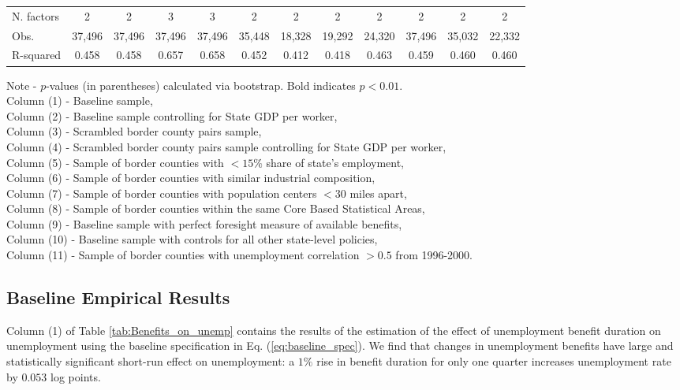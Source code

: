 \documentclass[12pt]{article}
\newcommand{\1}{\mathbf{1}}
\begin{document}
\begin{table}[t]
\begin{tabular}{lccccccccccc}
N. factors & 2 & 2 & 3 & 3 & 2 & 2 & 2 & 2 & 2 & 2 & 2\\
Obs. & 37,496 & 37,496 & 37,496 & 37,496 & 35,448 & 18,328 & 19,292 & 24,320 & 37,496 & 35,032 & 22,332\\
R-squared & 0.458 & 0.458 & 0.657 & 0.658 & 0.452 & 0.412 & 0.418 & 0.463 & 0.459 & 0.460 & 0.460\\ \hline
\end{tabular}
\parbox{16.5cm}{\noindent Note - $p$-values (in parentheses) calculated via bootstrap. Bold indicates $p<0.01$.\\
Column (1) - Baseline sample,\\
Column (2) - Baseline sample controlling for State GDP per worker,\\
Column (3) - Scrambled border county pairs sample,\\
Column (4) - Scrambled border county pairs sample controlling for State GDP per worker,\\
Column (5) - Sample of border counties with  $<15\%$ share of state's employment,\\
Column (6) - Sample of border counties with similar industrial composition,\\
Column (7) - Sample of border counties with population centers $<30$ miles apart,\\
Column (8) - Sample of border counties within the same Core Based Statistical Areas,\\
Column (9) - Baseline sample with perfect foresight measure of available benefits,\\
Column (10) - Baseline sample with controls for all other state-level policies, \\
Column (11) - Sample of border counties with unemployment correlation $>0.5$ from 1996-2000.
}
\vspace{-0.0cm}
\end{table}




\subsection{Baseline Empirical Results}
\label{sec:baseline_results}
Column (1) of Table \ref{tab:Benefits_on_unemp} contains the results of the estimation of the effect of unemployment benefit duration on unemployment using the baseline specification in Eq. (\ref{eq:baseline_spec}). We find that changes in unemployment benefits have large and statistically significant short-run effect on unemployment: a $1\%$ rise in benefit duration for only one quarter increases unemployment rate by $0.053$ log points.
\end{document}
